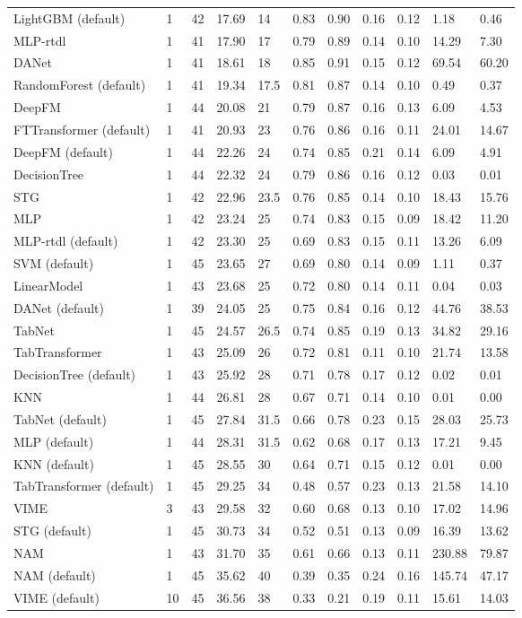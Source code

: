 \begin{tabular}{lllllllllll}
LightGBM (default) & 1 & 42 & 17.69 & 14 & 0.83 & 0.90 & 0.16 & 0.12 & 1.18 & 0.46 \\
MLP-rtdl & 1 & 41 & 17.90 & 17 & 0.79 & 0.89 & 0.14 & 0.10 & 14.29 & 7.30 \\
DANet & 1 & 41 & 18.61 & 18 & 0.85 & 0.91 & 0.15 & 0.12 & 69.54 & 60.20 \\
RandomForest (default) & 1 & 41 & 19.34 & 17.5 & 0.81 & 0.87 & 0.14 & 0.10 & 0.49 & 0.37 \\
DeepFM & 1 & 44 & 20.08 & 21 & 0.79 & 0.87 & 0.16 & 0.13 & 6.09 & 4.53 \\
FTTransformer (default) & 1 & 41 & 20.93 & 23 & 0.76 & 0.86 & 0.16 & 0.11 & 24.01 & 14.67 \\
DeepFM (default) & 1 & 44 & 22.26 & 24 & 0.74 & 0.85 & 0.21 & 0.14 & 6.09 & 4.91 \\
DecisionTree & 1 & 44 & 22.32 & 24 & 0.79 & 0.86 & 0.16 & 0.12 & 0.03 & 0.01 \\
STG & 1 & 42 & 22.96 & 23.5 & 0.76 & 0.85 & 0.14 & 0.10 & 18.43 & 15.76 \\
MLP & 1 & 42 & 23.24 & 25 & 0.74 & 0.83 & 0.15 & 0.09 & 18.42 & 11.20 \\
MLP-rtdl (default) & 1 & 42 & 23.30 & 25 & 0.69 & 0.83 & 0.15 & 0.11 & 13.26 & 6.09 \\
SVM (default) & 1 & 45 & 23.65 & 27 & 0.69 & 0.80 & 0.14 & 0.09 & 1.11 & 0.37 \\
LinearModel & 1 & 43 & 23.68 & 25 & 0.72 & 0.80 & 0.14 & 0.11 & 0.04 & 0.03 \\
DANet (default) & 1 & 39 & 24.05 & 25 & 0.75 & 0.84 & 0.16 & 0.12 & 44.76 & 38.53 \\
TabNet & 1 & 45 & 24.57 & 26.5 & 0.74 & 0.85 & 0.19 & 0.13 & 34.82 & 29.16 \\
TabTransformer & 1 & 43 & 25.09 & 26 & 0.72 & 0.81 & 0.11 & 0.10 & 21.74 & 13.58 \\
DecisionTree (default) & 1 & 43 & 25.92 & 28 & 0.71 & 0.78 & 0.17 & 0.12 & 0.02 & 0.01 \\
KNN & 1 & 44 & 26.81 & 28 & 0.67 & 0.71 & 0.14 & 0.10 & 0.01 & 0.00 \\
TabNet (default) & 1 & 45 & 27.84 & 31.5 & 0.66 & 0.78 & 0.23 & 0.15 & 28.03 & 25.73 \\
MLP (default) & 1 & 44 & 28.31 & 31.5 & 0.62 & 0.68 & 0.17 & 0.13 & 17.21 & 9.45 \\
KNN (default) & 1 & 45 & 28.55 & 30 & 0.64 & 0.71 & 0.15 & 0.12 & 0.01 & 0.00 \\
TabTransformer (default) & 1 & 45 & 29.25 & 34 & 0.48 & 0.57 & 0.23 & 0.13 & 21.58 & 14.10 \\
VIME & 3 & 43 & 29.58 & 32 & 0.60 & 0.68 & 0.13 & 0.10 & 17.02 & 14.96 \\
STG (default) & 1 & 45 & 30.73 & 34 & 0.52 & 0.51 & 0.13 & 0.09 & 16.39 & 13.62 \\
NAM & 1 & 43 & 31.70 & 35 & 0.61 & 0.66 & 0.13 & 0.11 & 230.88 & 79.87 \\
NAM (default) & 1 & 45 & 35.62 & 40 & 0.39 & 0.35 & 0.24 & 0.16 & 145.74 & 47.17 \\
VIME (default) & 10 & 45 & 36.56 & 38 & 0.33 & 0.21 & 0.19 & 0.11 & 15.61 & 14.03 \\
\bottomrule
\end{tabular}
